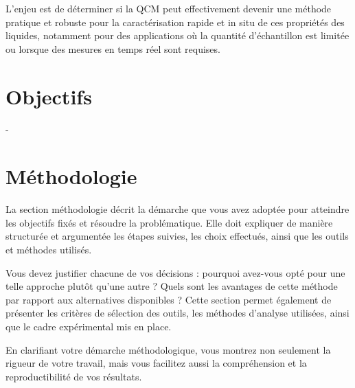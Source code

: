 L'enjeu est de déterminer si la QCM peut effectivement devenir une méthode pratique et robuste pour la caractérisation rapide et in situ de ces propriétés des liquides, notamment pour des applications où la quantité d'échantillon est limitée ou lorsque des mesures en temps réel sont requises.

\section{Objectifs}
- 

\section{Méthodologie}

La section méthodologie décrit la démarche que vous avez adoptée pour atteindre les objectifs fixés et résoudre la problématique. Elle doit expliquer de manière structurée et argumentée les étapes suivies, les choix effectués, ainsi que les outils et méthodes utilisés.

Vous devez justifier chacune de vos décisions : pourquoi avez-vous opté pour une telle approche plutôt qu'une autre ? Quels sont les avantages de cette méthode par rapport aux alternatives disponibles ? Cette section permet également de présenter les critères de sélection des outils, les méthodes d'analyse utilisées, ainsi que le cadre expérimental mis en place.

En clarifiant votre démarche méthodologique, vous montrez non seulement la rigueur de votre travail, mais vous facilitez aussi la compréhension et la reproductibilité de vos résultats.
